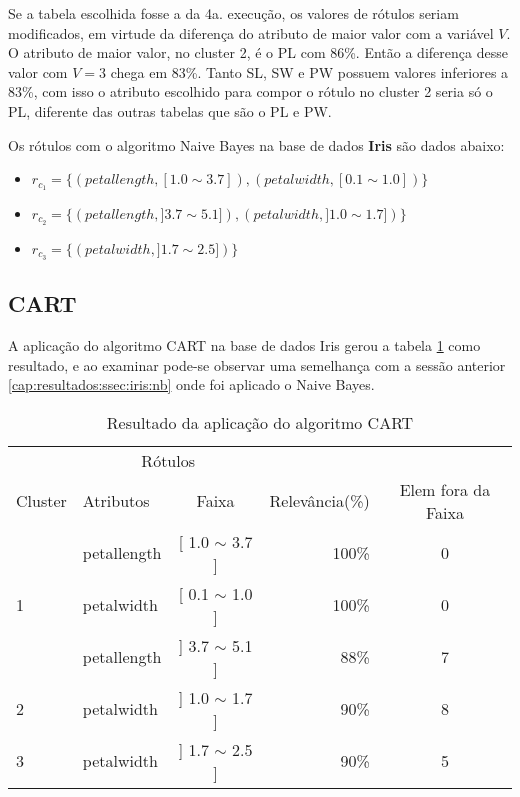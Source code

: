 Se a tabela escolhida fosse a da 4a. execução, os valores de rótulos seriam modificados, em virtude da diferença do atributo de maior valor com a variável ${V}$. O atributo de maior valor, no cluster 2, é o PL com 86\%. Então a diferença desse valor com ${V=3}$ chega em 83\%. Tanto SL, SW e PW possuem valores inferiores a 83\%, com isso o atributo escolhido para compor o rótulo  no cluster 2 seria só o PL, diferente das outras tabelas que são o PL e PW.

Os rótulos com o algoritmo Naive Bayes na base de dados \textbf{Iris} são dados abaixo:
\begin{itemize}[noitemsep]
 \item ${r_{c_1}=\{ (petallength, [ 1.0 \sim 3.7]), (petalwidth,[ 0.1 \sim 1.0 ] ) \} }$  
 \item ${r_{c_2}=\{ (petallength, ] 3.7 \sim 5.1]), (petalwidth,] 1.0 \sim 1.7 ] )\} }$
 \item ${r_{c_3}=\{ (petalwidth, ] 1.7 \sim 2.5 ]) \} }$
\end{itemize}

\subsection{CART} \label{cap:resultados:ssec:iris:cart}

A aplicação do algoritmo CART na base de dados Iris gerou a tabela \ref{tab:rot:iris:cart} como resultado, e ao examinar pode-se observar uma semelhança com a sessão anterior \ref{cap:resultados:ssec:iris:nb} onde foi aplicado o Naive Bayes. 

\begin{table}[!h]
\centering
\caption{Resultado da aplicação do algoritmo CART}
\label{tab:rot:iris:cart}
\begin{tabular}{llcrc} \hline
 
\multicolumn{1}{c}{\cellcolor[HTML]{FFFFFF}} & \multicolumn{2}{c}{Rótulos}                & \multicolumn{1}{r}{}               & \\ \cline{2-3}
Cluster                                      & Atributos      & \multicolumn{1}{c}{Faixa} & \multicolumn{1}{c}{Relevância(\%)} & Elem fora da Faixa\\ \hline \hline
                                             & petallength    & [ 1.0 $\sim$  3.7 ]       & 100\%                               & 0 \\  
\multirow{-2}{*}{1}                          & petalwidth     & [ 0.1 $\sim$  1.0 ]       & 100\%                               & 0 \\  \hline
                                             & petallength    & ] 3.7 $\sim$  5.1 ]       & 88\%                               & 7\\ 
\multirow{-2}{*}{2}                          & petalwidth     & ] 1.0 $\sim$  1.7 ]       & 90\%                               & 8\\  \hline
3                                            & petalwidth     & ] 1.7 $\sim$  2.5 ]       & 90\%                               & 5\\ \hline \hline
\end{tabular}
\end{table}

